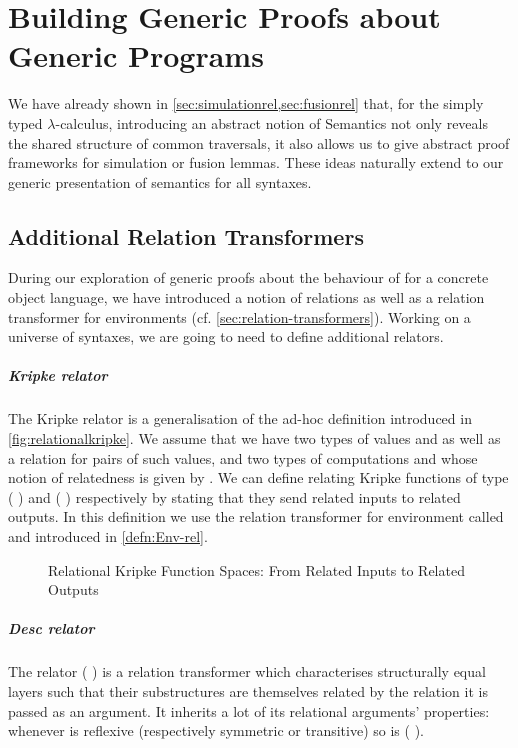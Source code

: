 \chapter{Building Generic Proofs about Generic Programs}

We have already shown in \cref{sec:simulationrel,sec:fusionrel} that, for the
simply typed $\lambda$-calculus, introducing an abstract notion of Semantics
not only reveals the shared structure of common traversals, it also allows
us to give abstract proof frameworks for simulation or fusion lemmas. These
ideas naturally extend to our generic presentation of semantics for all syntaxes.

\section{Additional Relation Transformers}

During our exploration of generic proofs about the behaviour of 
for a concrete object language, we have introduced a notion  of
relations as well as a relation transformer for environments
(cf. \cref{sec:relation-transformers}). Working on a universe of syntaxes,
we are going to need to define additional relators.

\paragraph{Kripke relator}
The Kripke relator is a generalisation of the ad-hoc definition introduced
in \cref{fig:relationalkripke}. We assume that we have two types of values
 and 
as well as a relation  for pairs of such values, and two types
of computations  and  whose notion of relatedness is
given by . We can define
 relating Kripke functions of type
{(  )} and {(  )}
respectively by stating that they send related inputs
to related outputs. In this definition we use the relation transformer for
environment called  and introduced in \cref{defn:Env-rel}.

\begin{figure}[h]
\caption{Relational Kripke Function Spaces: From Related Inputs to Related Outputs\label{fig:Kripke-rel}}
\end{figure}

\paragraph{Desc relator}\label{def:zipd}
The relator (  ) is a relation transformer which characterises
structurally equal layers such that their substructures are themselves related
by the relation it is passed as an argument. It inherits a lot of its relational
arguments' properties: whenever  is reflexive (respectively symmetric or
transitive) so is {(   )}.\label{lem:zipstable}

